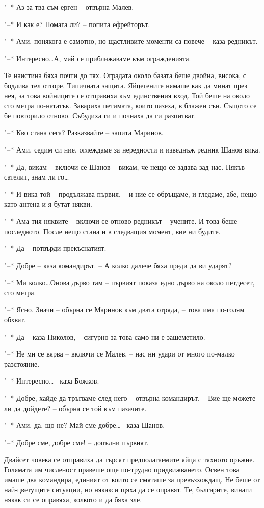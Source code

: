 \documentclass[ebook,openany,12pt]{memoir}
\begin{document}
"--* Аз за тва съм ерген – отвърна Малев.

"--* И как е? Помага ли? – попита ефрейторът.

"--* Ами, понякога е самотно, но щастливите моменти са повече – каза редникът.

"--* Интересно\ldots А, май се приближаваме към огражденията.

Те наистина бяха почти до тях. Оградата около базата беше двойна, висока, с бодлива тел отгоре. Типичната защита. Яйцегените нямаше как да минат през нея, за това войниците се отправиха към единствения вход. Той беше на около сто метра по-нататък. Завариха петимата, които пазеха, в блажен сън. Същото се бе повторило отново. Събудиха ги и почнаха да ги разпитват.

"--* Кво стана сега? Разказвайте – запита Маринов.

"--* Ами, седим си ние, оглеждаме за нередности и изведнъж редник Шанов вика.

"--* Да, викам – включи се Шанов – викам, че нещо се задава зад нас. Някъв сателит, знам ли го\ldots

"--* И вика той – продължава първия, – и ние се обръщаме, и гледаме, абе, нещо като антена и я бутат някви. 

"--* Ама тия няквите – включи се отново редникът – учените. И това беше последното. После нещо стана и в следващия момент, вие ни будите.

"--* Да – потвърди прекъснатият.

"--* Добре – каза командирът. – А колко далече бяха преди да ви ударят?

"--* Ми колко\ldots Онова дърво там – първият показа едно дърво на около петдесет, сто метра.

"--* Ясно. Значи -- обърна се Маринов към двата отряда, – това има по-голям обхват.

"--* Да -- каза Николов, – сигурно за това само ни е зашеметило.

"--* Не ми се вярва – включи се Малев, – нас ни удари от много по-малко разстояние.

"--* Интересно\ldots – каза Божков.

"--* Добре, хайде да тръгваме след него – отвърна командирът. – Вие ще можете ли да дойдете? – обърна се той към пазачите.

"--* Ами, да, що не? Май сме добре\ldots – каза Шанов.

"--* Добре сме, добре сме! – допълни първият.

Двайсет човека се отправиха да търсят предполагаемите яйца с тяхното оръжие. Голямата им численост правеше още по-трудно придвижването. Освен това имаше два командира, единият от които се смяташе за превъзхождащ. Не беше от най-цветущите ситуации, но някакси щяха да се оправят. Те, българите, винаги някак си се оправяха, колкото и да бяха зле.
\end{document}
